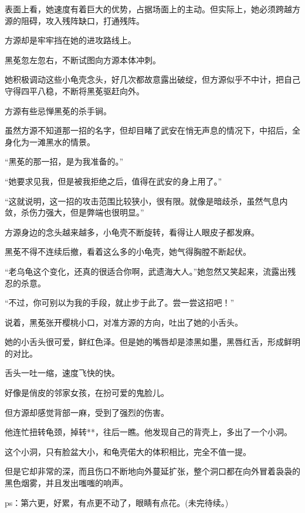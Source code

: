 \begin{this_body}
表面上看，她速度有着巨大的优势，占据场面上的主动。但实际上，她必须跨越方源的阻碍，攻入残阵缺口，打通残阵。

方源却是牢牢挡在她的进攻路线上。

黑莬忽左忽右，不断试图向方源本体冲刺。

她积极调动这些小龟壳念头，好几次都故意露出破绽，但方源似乎不中计，把自己守得四平八稳，不断将黑莬驱赶向外。

方源有些忌惮黑莬的杀手锏。

虽然方源不知道那一招的名字，但却目睹了武安在悄无声息的情况下，中招后，全身化为一滩黑水的情景。

“黑莬的那一招，是为我准备的。”

“她要求见我，但是被我拒绝之后，值得在武安的身上用了。”

“这就说明，这一招的攻击范围比较狭小，很有限。就像是暗歧杀，虽然气息内敛，杀伤力强大，但是弊端也很明显。”

方源身边的念头越来越多，小龟壳不断旋转，看得让人眼皮子都发麻。

黑莬不得不连续后撤，看着这么多的小龟壳，她气得胸膛不断起伏。

“老乌龟这个变化，还真的很适合你啊，武遗海大人。”她忽然又笑起来，流露出残忍的杀意。

“不过，你可别以为我的手段，就止步于此了。尝一尝这招吧！”

说着，黑莬张开樱桃小口，对准方源的方向，吐出了她的小舌头。

她的小舌头很可爱，鲜红色泽。但是她的嘴唇却是漆黑如墨，黑唇红舌，形成鲜明的对比。

舌头一吐一缩，速度飞快的快。

好像是俏皮的邻家女孩，在扮可爱的鬼脸儿。

但方源却感觉背部一麻，受到了强烈的伤害。

他连忙扭转龟颈，掉转**，往后一瞧。他发现自己的背壳上，多出了一个小洞。

这个小洞，只有脸盆大小，和龟壳偌大的体积相比，完全不值一提。

但是它却非常的深，而且伤口不断地向外蔓延扩张，整个洞口都在向外冒着袅袅的黑色烟雾，并且发出嗤嗤的响声。

ps：第六更，好累，有点更不动了，眼睛有点花。(未完待续。)

\end{this_body}

